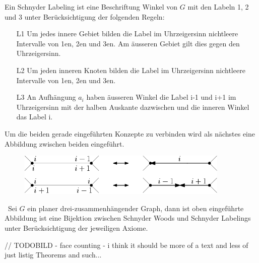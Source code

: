 \begin{definition}
Ein Schnyder Labeling ist eine Beschriftung Winkel von $G$ mit den Labeln 1, 2 und 3 unter Berücksichtigung der folgenden Regeln:
\begin{itemize}
\item[L1] Um jedes innere Gebiet bilden die Label im Uhrzeigersinn nichtleere Intervalle von 1en, 2en und 3en. Am äusseren Gebiet gilt dies gegen den Uhrzeigersinn.
\item[L2] Um jeden inneren Knoten bilden die Label im Uhrzeigersinn nichtleere Intervalle von 1en, 2en und 3en.
\item[L3] An Aufhängung $a_i$ haben äusseren Winkel die Label i-1 und i+1 im Uhrzeigersinn mit der halben Auskante dazwischen und die inneren Winkel das Label i.
\end{itemize} 
\end{definition}

Um die beiden gerade eingeführten Konzepte zu verbinden wird als nächstes eine Abbildung zwischen beiden eingeführt.

\begin{figure}[h]
	\centering
  \includegraphics[width=0.9\textwidth]{schnyder_bij.png}
	\label{schnyder_bij}
\end{figure}

\begin{theorem}\
Sei $G$ ein planer drei-zusammenhängender Graph, dann ist oben eingeführte Abbildung ist eine Bijektion zwischen Schnyder Woods und Schnyder Labelings unter Berücksichtigung der jeweiligen Axiome.
\end{theorem}

// TODOBILD 
 - face counting
 - i think it should be more of a text and less of just listig Theorems and such...

